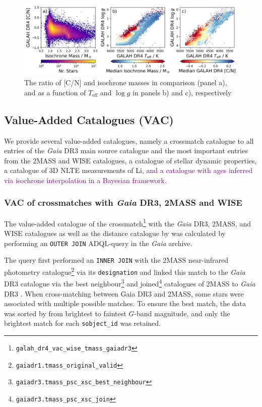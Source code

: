 \documentclass[
  journal=pasa,
  manuscript=research-paper, %
  year=2024,
  volume=37
]{cup-journal}
\newcommand{\SB}[1]{{\textcolor{purple}{#1}}}
\newcommand{\Teff}{$T_\mathrm{eff}$\xspace}
\newcommand{\logg}{$\log g$\xspace}
\newcommand{\Gaia}{\textit{Gaia}\xspace}
\begin{document}
\begin{figure}[ht]
    \centering
    \includegraphics[width=\textwidth]{figures/cn_mass.png}
    \caption{The ratio of [C/N] and isochrone masses in comparison (panel a), and as a function of \Teff and \logg in panels b) and c), respectively}
    \label{fig:cn_mass}
\end{figure}

\subsection{Value-Added Catalogues (VAC)} \label{sec:vacs}

We provide several value-added catalogues, namely a crossmatch catalogue to all entries of the \Gaia DR3 main source catalogue and the most important entries from the 2MASS and WISE catalogues, a catalogue of stellar dynamic properties, a catalogue of 3D NLTE measurements of Li, \SB{and a catalogue with ages inferred via isochrone interpolation in a Bayesian framework}.

\subsubsection{VAC of crossmatches with \Gaia DR3, 2MASS and WISE} \label{sec:vac_crossmatch}

The value-added catalogue of the crossmatch\footnote{\texttt{galah\_dr4\_vac\_wise\_tmass\_gaiadr3}} with the \Gaia DR3, 2MASS, and WISE catalogues as well as the distance catalogue by \citet{BailerJones2021} was calculated by performing an \texttt{OUTER JOIN} ADQL-query in the \Gaia archive. 

The query first performed an \texttt{INNER JOIN} with the 2MASS near-infrared photometry catalogue\footnote{\texttt{gaiadr1.tmass\_original\_valid}} \citep{Skrutskie2006} via its \texttt{designation} and linked this match to the \Gaia DR3 catalogue via the best neighbour\footnote{ \texttt{gaiadr3.tmass\_psc\_xsc\_best\_neighbour}} and joined\footnote{\texttt{gaiadr3.tmass\_psc\_xsc\_join}} catalogues of 2MASS to \Gaia DR3 \citep{Torra2021}. When cross-matching between Gaia DR3 and 2MASS, some stars were associated with multiple possible matches. To ensure the best match, the data was sorted by from brightest to faintest \(G\)-band magnitude, and only the brightest match for each \texttt{sobject\_id} was retained.
\end{document}
